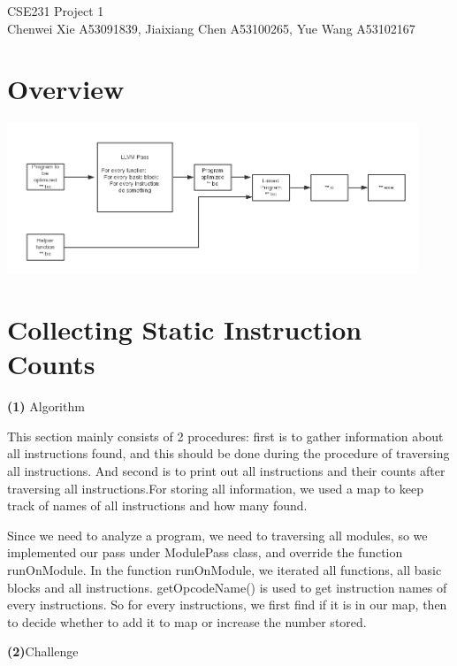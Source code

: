 \documentclass{article}
\renewcommand{\part}[1] {\vspace{.10in} {\bf (#1)}}
\newcommand{\myname}{Chenwei Xie A53091839,  Jiaixiang Chen A53100265, Yue Wang A53102167}
\begin{document}
\thispagestyle{plain}
\begin{center}                  %
{\Large CSE231 Project 1 } \\
\myname \\
\end{center}

\section{Overview}

\includegraphics[height=4.5cm]{graph.png}\\

\section{Collecting Static Instruction Counts}

\part{1} Algorithm
	

This section mainly consists of 2 procedures: first is to gather information about all instructions found, and this should be done during the procedure of traversing all instructions. And second is to print out all instructions and their counts after traversing all instructions.For storing all information, we used a map to keep track of names of all instructions and how many found.

Since we need to analyze a program, we need to traversing all modules, so we implemented our pass under ModulePass class, and override the function runOnModule. In the function runOnModule, we iterated all functions, all basic blocks and all instructions. getOpcodeName() is used to get instruction names of every instructions. So for every instructions, we first find if it is in our map, then to decide whether to add it to map or increase the number stored.
	
\part{2}Challenge
	
\end{document}
